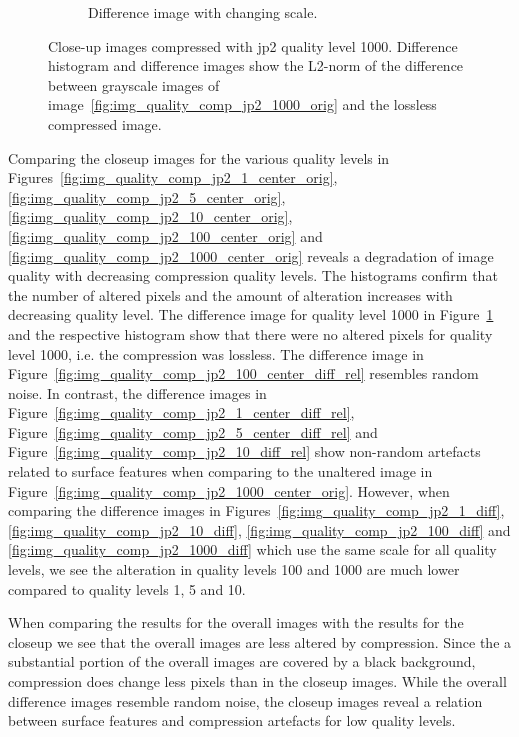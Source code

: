 \begin{figure}[htb]
\begin{subfigure}[b]{0.48\textwidth}
        \caption{Difference image with changing scale.}
        \label{fig:img_quality_comp_jp2_1000_center_diff_rel}
    \end{subfigure}
    \caption{Close-up images compressed with \gls{jp2} quality level 1000. Difference histogram and difference images show the L2-norm of the difference between grayscale images of image~\ref{fig:img_quality_comp_jp2_1000_orig} and the lossless compressed image.}
    \label{fig:img_quality_comp_jp2_1000_center}
\end{figure}

Comparing the closeup images for the various quality levels in Figures~\ref{fig:img_quality_comp_jp2_1_center_orig}, \ref{fig:img_quality_comp_jp2_5_center_orig}, \ref{fig:img_quality_comp_jp2_10_center_orig}, \ref{fig:img_quality_comp_jp2_100_center_orig} and \ref{fig:img_quality_comp_jp2_1000_center_orig} reveals a degradation of image quality with decreasing compression quality levels. The histograms confirm that the number of altered pixels and the amount of alteration increases with decreasing quality level. The difference image for quality level 1000 in Figure~\ref{fig:img_quality_comp_jp2_1000_center_diff_rel} and the respective histogram show that there were no altered pixels for quality level 1000, i.e. the compression was lossless. The difference image in Figure~\ref{fig:img_quality_comp_jp2_100_center_diff_rel} resembles random noise. In contrast, the difference images in Figure~\ref{fig:img_quality_comp_jp2_1_center_diff_rel}, Figure~\ref{fig:img_quality_comp_jp2_5_center_diff_rel} and Figure~\ref{fig:img_quality_comp_jp2_10_diff_rel} show non-random artefacts related to surface features when comparing to the unaltered image in Figure~\ref{fig:img_quality_comp_jp2_1000_center_orig}. However, when comparing the difference images in Figures~\ref{fig:img_quality_comp_jp2_1_diff}, \ref{fig:img_quality_comp_jp2_10_diff}, \ref{fig:img_quality_comp_jp2_100_diff} and \ref{fig:img_quality_comp_jp2_1000_diff} which use the same scale for all quality levels, we see the alteration in quality levels \SI{100}{} and \SI{1000}{} are much lower compared to quality levels \SI{1}{}, \SI{5}{} and \SI{10}{}.

When comparing the results for the overall images with the results for the closeup we see that the overall images are less altered by compression. Since the a substantial portion of the  overall images are covered by a black background, compression does change less pixels than in the closeup images. While the overall difference images resemble random noise, the closeup images reveal a relation between surface features and compression artefacts for low quality levels.

